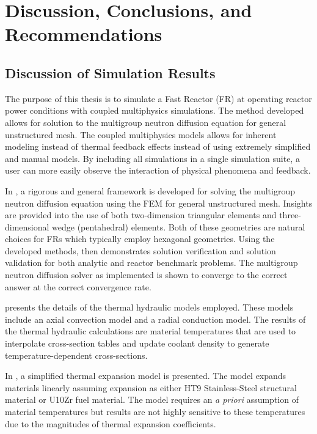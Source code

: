 \chapter{Discussion, Conclusions, and Recommendations}
\label{ch:conclusions}

\section{Discussion of Simulation Results}

  The purpose of this thesis is to simulate a Fast Reactor (FR) at operating
  reactor power conditions with coupled multiphysics simulations. The method
  developed allows for solution to the multigroup neutron diffusion equation for
  general unstructured mesh. The coupled multiphysics models allows for inherent
  modeling instead of thermal feedback effects instead of using extremely
  simplified and manual models. By including all simulations in a single
  simulation suite, a user can more easily observe the interaction of 
  physical phenomena and feedback.

  In , a rigorous and general framework is developed
  for solving the multigroup neutron diffusion equation using the FEM for
  general unstructured mesh. Insights are provided into the use of both
  two-dimension triangular elements and three-dimensional wedge (pentahedral)
  elements. Both of these geometries are natural choices for FRs which typically
  employ hexagonal geometries. Using the developed methods,
   then demonstrates solution verification and
  solution validation for both analytic and reactor benchmark problems. The
  multigroup neutron diffusion solver as implemented is shown to converge to the
  correct answer at the correct convergence rate.

   presents the details of the thermal hydraulic
  models employed. These models include an axial convection model and a radial
  conduction model. The results of the thermal hydraulic calculations are
  material temperatures that are used to interpolate cross-section tables and
  update coolant density to generate temperature-dependent cross-sections.

  In , a simplified thermal expansion model is
  presented. The model expands materials linearly assuming expansion as either
  HT9 Stainless-Steel structural material or U10Zr fuel material. The model
  requires an \textit{a priori} assumption of material temperatures but results
  are not highly sensitive to these temperatures due to the magnitudes of
  thermal expansion coefficients.

